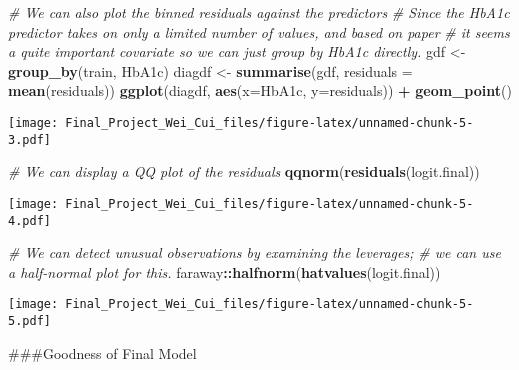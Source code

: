 \documentclass[
]{article}
\newenvironment{Shaded}{\begin{snugshade}}{\end{snugshade}}
\newcommand{\CommentTok}[1]{\textcolor[rgb]{0.56,0.35,0.01}{\textit{#1}}}
\newcommand{\DataTypeTok}[1]{\textcolor[rgb]{0.13,0.29,0.53}{#1}}
\newcommand{\KeywordTok}[1]{\textcolor[rgb]{0.13,0.29,0.53}{\textbf{#1}}}
\newcommand{\NormalTok}[1]{#1}
\newcommand{\OperatorTok}[1]{\textcolor[rgb]{0.81,0.36,0.00}{\textbf{#1}}}
\newcommand{\StringTok}[1]{\textcolor[rgb]{0.31,0.60,0.02}{#1}}
\begin{document}
\begin{Shaded}
\begin{Highlighting}[]
\CommentTok{# We can also plot the binned residuals against the predictors}
\CommentTok{# Since the HbA1c predictor takes on only a limited number of values, and based on paper}
\CommentTok{# it seems a quite important covariate so we can just group by HbA1c directly.}
\NormalTok{gdf <-}\StringTok{ }\KeywordTok{group_by}\NormalTok{(train, HbA1c)}
\NormalTok{diagdf <-}\StringTok{ }\KeywordTok{summarise}\NormalTok{(gdf, }\DataTypeTok{residuals =} \KeywordTok{mean}\NormalTok{(residuals)) }
\KeywordTok{ggplot}\NormalTok{(diagdf, }\KeywordTok{aes}\NormalTok{(}\DataTypeTok{x=}\NormalTok{HbA1c, }\DataTypeTok{y=}\NormalTok{residuals)) }\OperatorTok{+}\StringTok{ }\KeywordTok{geom_point}\NormalTok{()}
\end{Highlighting}
\end{Shaded}

\texttt{[image: Final\_Project\_Wei\_Cui\_files/figure-latex/unnamed-chunk-5-3.pdf]}

\begin{Shaded}
\begin{Highlighting}[]
\CommentTok{# We can display a QQ plot of the residuals}
\KeywordTok{qqnorm}\NormalTok{(}\KeywordTok{residuals}\NormalTok{(logit.final))}
\end{Highlighting}
\end{Shaded}

\texttt{[image: Final\_Project\_Wei\_Cui\_files/figure-latex/unnamed-chunk-5-4.pdf]}

\begin{Shaded}
\begin{Highlighting}[]
\CommentTok{# We can detect unusual observations by examining the leverages; }
\CommentTok{# we can use a half-normal plot for this.}
\NormalTok{faraway}\OperatorTok{::}\KeywordTok{halfnorm}\NormalTok{(}\KeywordTok{hatvalues}\NormalTok{(logit.final))}
\end{Highlighting}
\end{Shaded}

\texttt{[image: Final\_Project\_Wei\_Cui\_files/figure-latex/unnamed-chunk-5-5.pdf]}

\#\#\#Goodness of Final Model
\end{document}
